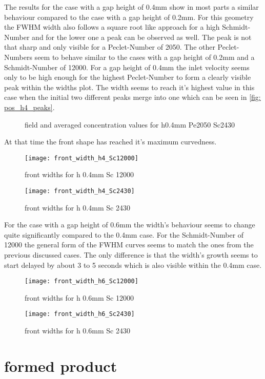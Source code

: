 \documentclass[../thesis.tex]{subfiles}
\begin{document}
The results for the case with a gap height of 0.4mm show in most parts a similar behaviour compared to the case with a gap height of 0.2mm. For this geometry the FWHM width also follows a square root like approach for a high Schmidt-Number and for the lower one a peak can be observed as well. The peak is not that sharp and only visible for a Peclet-Number of 2050. The other Peclet-Numbers seem to behave similar to the cases with a gap height of 0.2mm and a Schmidt-Number of 12000. For a gap height of 0.4mm the inlet velocity seems only to be high enough for the highest Peclet-Number to form a clearly visible peak within the widths plot. The width seems to reach it's highest value in this case when the initial two different peaks merge into one which can be seen in \autoref{fig: pos_h4_peaks}.
\begin{figure}[htb]
	\centering
	\qquad
	\caption{field and averaged concentration values for h0.4mm Pe2050 Sc2430}%
	\label{fig: pos_h4_peaks}%
\end{figure}

At that time the front shape has reached it's maximum curvedness.

\begin{figure}[htbp]
	\centering
	\texttt{[image: front\_width\_h4\_Sc12000]}
	\caption{front widths for h 0.4mm Sc 12000\label{fig: front_width_h4_Sc12000}}\bigskip
	\texttt{[image: front\_width\_h4\_Sc2430]}
	\caption{front widths for h 0.4mm Sc 2430\label{fig: front_width_pos_h4_Sc2430}}
\end{figure}

For the case with a gap height of 0.6mm the width's behaviour seems to change quite significantly compared to the 0.4mm case. For the Schmidt-Number of 12000 the general form of the FWHM curves seems to match the ones from the previous discussed cases. The only difference is that the width's growth seems to start delayed by about 3 to 5 seconds which is also visible within the 0.4mm case.
\begin{figure}[htbp]
	\centering
	\texttt{[image: front\_width\_h6\_Sc12000]}
	\caption{front widths for h 0.6mm Sc 12000\label{fig: front_width_h6_Sc12000}}\bigskip
	\texttt{[image: front\_width\_h6\_Sc2430]}
	\caption{front widths for h 0.6mm Sc 2430\label{fig: front_width_pos_h6_Sc2430}}
\end{figure}

\section{formed product}
\end{document}
